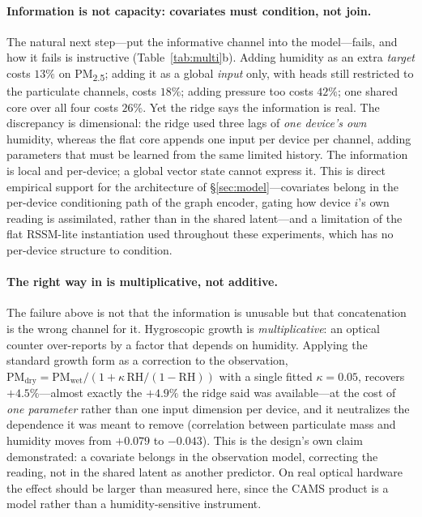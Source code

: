 \documentclass[10pt]{article}
\begin{document}
\paragraph{Information is not capacity: covariates must condition, not join.}
The natural next step---put the informative channel into the model---fails, and how
it fails is instructive (Table~\ref{tab:multi}b). Adding humidity as an extra
\emph{target} costs $13\%$ on PM\textsubscript{2.5}; adding it as a global
\emph{input} only, with heads still restricted to the particulate channels, costs
$18\%$; adding pressure too costs $42\%$; one shared core over all four costs
$26\%$. Yet the ridge says the information is real. The discrepancy is dimensional:
the ridge used three lags of \emph{one device's own} humidity, whereas the flat core
appends one input per device per channel, adding parameters that must be learned
from the same limited history. The information is local and per-device; a global
vector state cannot express it. This is direct empirical support for the
architecture of \S\ref{sec:model}---covariates belong in the per-device conditioning
path of the graph encoder, gating how device $i$'s own reading is assimilated,
rather than in the shared latent---and a limitation of the flat RSSM-lite
instantiation used throughout these experiments, which has no per-device structure
to condition.

\paragraph{The right way in is multiplicative, not additive.}
The failure above is not that the information is unusable but that concatenation
is the wrong channel for it. Hygroscopic growth is \emph{multiplicative}: an
optical counter over-reports by a factor that depends on humidity. Applying the
standard growth form as a correction to the observation,
$\text{PM}_{\text{dry}}=\text{PM}_{\text{wet}}/(1+\kappa\,\text{RH}/(1-\text{RH}))$
with a single fitted $\kappa=0.05$, recovers $+4.5\%$---almost exactly the $+4.9\%$
the ridge said was available---at the cost of \emph{one parameter} rather than one
input dimension per device, and it neutralizes the dependence it was meant to
remove (correlation between particulate mass and humidity moves from $+0.079$ to
$-0.043$). This is the design's own claim demonstrated: a covariate belongs in the
observation model, correcting the reading, not in the shared latent as another
predictor. On real optical hardware the effect should be larger than measured
here, since the CAMS product is a model rather than a humidity-sensitive
instrument.
\end{document}
